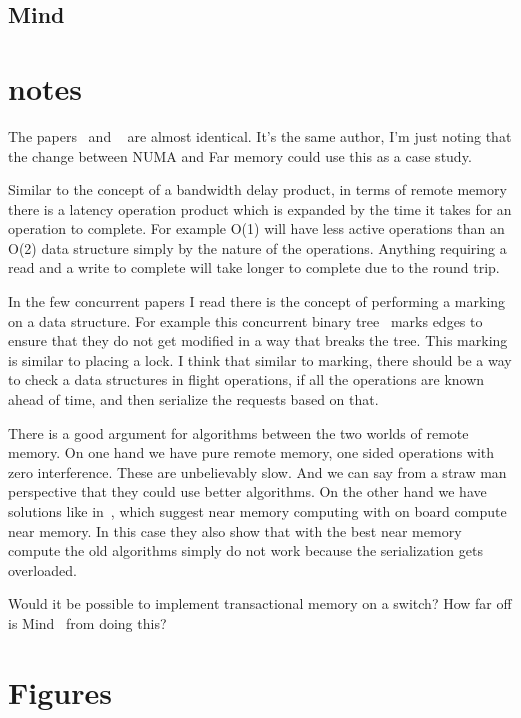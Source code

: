 \subsection{Mind}



\section{notes}

The papers~\cite{one-sided-hash} and ~\cite{write-optimized-hash} are almost
identical. It's the same author, I'm just noting that the change between NUMA
and Far memory could use this as a case study.

Similar to the concept of a bandwidth delay product, in terms of remote memory
there is a latency operation product which is expanded by the time it takes for
an operation to complete. For example O(1) will have less active operations than
an O(2) data structure simply by the nature of the operations. Anything requiring
a read and a write to complete will take longer to complete due to the round
trip.

In the few concurrent papers I read there is the concept of performing a marking
on a data structure. For example this concurrent binary
tree~\cite{fast-concurrent-bin} marks edges to ensure that they do not get
modified in a way that breaks the tree. This marking is similar to placing a
lock. I think that similar to marking, there should be a way to check a data
structures in flight operations, if all the operations are known ahead of time,
and then serialize the requests based on that.

There is a good argument for algorithms between the two worlds of remote memory.
On one hand we have pure remote memory, one sided operations with zero
interference. These are unbelievably slow. And we can say from a straw man
perspective that they could use better algorithms. On the other hand we have
solutions like in~\cite{design-far-memory-struct,near-memory-structs}, which
suggest near memory computing with on board compute near memory. In this case
they also show that with the best near memory compute the old algorithms simply
do not work because the serialization gets overloaded.

Would it be possible to implement transactional memory on a switch? How far off
is Mind~\cite{mind} from doing this?

\section{Figures}





